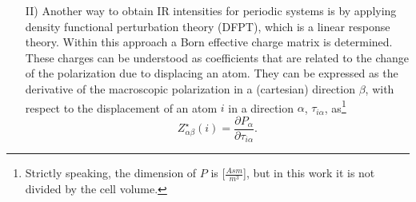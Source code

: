 \documentclass[11pt,DIV=13,BCOR=5mm,a4paper,headinclude]{scrbook}
\renewcommand{\vec}[1]{\underline{#1}}
\begin{document}
\begin{itemize}




\item[II)] Another way to obtain IR intensities for periodic systems is by applying density functional perturbation theory (DFPT)\cite{Baroni1987,Giannozzi1991}, which is a linear response theory.
Within this approach a Born effective charge matrix is determined\cite{Born1954}.
These charges can be understood as coefficients that are related to the change of the polarization due to displacing an atom.
They can be expressed as the derivative of the macroscopic polarization in a (cartesian) direction $\beta$, with respect to the displacement of an atom $i$ in a direction $\alpha$, $\tau_{i\alpha}$, as\footnote{Strictly speaking, the dimension of $P$ is [$\frac{Asm}{m^3}$], but in this work it is not divided by the cell volume.}
\begin{equation}
Z^\star_{\alpha\beta}(i)=\frac{\partial P_\alpha}{\partial \tau_{i\alpha}}.
\end{equation}


\end{itemize}
\end{document}
